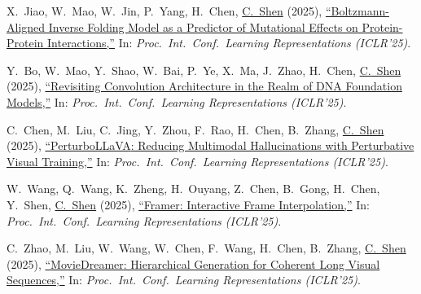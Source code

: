 \documentclass[9pt, a4paper]{article}
\newcommand{\years}[1]{\marginnote{\scriptsize #1}}
\def\highlight{\uline}
\begin{document}
\medskip

\years{2025} X.~Jiao, W.~Mao, W.~Jin, P.~Yang, H.~Chen, \highlight{C.~Shen} (2025),
\href{http://www.google.com/search?lr=&ie=UTF-8&oe=UTF-8&q=Boltzmann-Aligned+Inverse+Folding+Model+as+a+Predictor+of+Mutational+Effects+on+Protein-Protein+Interactions+Xiaoran+Jiao%2C+Weian+Mao%2C+Wengong+Jin%2C+Peiyuan+Yang%2C+Hao+Chen%2C+Chunhua+Shen}{``Boltzmann-Aligned Inverse Folding Model as a Predictor of Mutational Effects on Protein-Protein Interactions,{}''}
In: \emph{Proc.\ Int.\ Conf.\  Learning Representations (ICLR'25)}.

\medskip

\years{2025} Y.~Bo, W.~Mao, Y.~Shao, W.~Bai, P.~Ye, X.~Ma, J.~Zhao, H.~Chen, \highlight{C.~Shen} (2025),
\href{http://www.google.com/search?lr=&ie=UTF-8&oe=UTF-8&q=Revisiting+Convolution+Architecture+in+the+Realm+of+DNA+Foundation+Models+Yu+Bo%2C+Weian+Mao%2C+Yanjun+Shao%2C+Weiqiang+Bai%2C+Peng+Ye%2C+Xinzhu+Ma%2C+Junbo+Zhao%2C+Hao+Chen%2C+Chunhua+Shen}{``Revisiting Convolution Architecture in the Realm of {DNA} Foundation Models,{}''}
In: \emph{Proc.\ Int.\ Conf.\  Learning Representations (ICLR'25)}.

\medskip

\years{2025} C.~Chen, M.~Liu, C.~Jing, Y.~Zhou, F.~Rao, H.~Chen, B.~Zhang, \highlight{C.~Shen} (2025),
\href{http://www.google.com/search?lr=&ie=UTF-8&oe=UTF-8&q=PerturboLLaVA%3A+Reducing+Multimodal+Hallucinations+with+Perturbative+Visual+Training+Cong+Chen%2C+Mingyu+Liu%2C+Chenchen+Jing%2C+Yizhou+Zhou%2C+Fengyun+Rao%2C+Hao+Chen%2C+Bo+Zhang%2C+Chunhua+Shen}{``{PerturboLLaVA}: Reducing Multimodal Hallucinations with Perturbative Visual Training,{}''}
In: \emph{Proc.\ Int.\ Conf.\  Learning Representations (ICLR'25)}.

\medskip

\years{2025} W.~Wang, Q.~Wang, K.~Zheng, H.~Ouyang, Z.~Chen, B.~Gong, H.~Chen, Y.~Shen, \highlight{C.~Shen} (2025),
\href{http://www.google.com/search?lr=&ie=UTF-8&oe=UTF-8&q=Framer%3A+Interactive+Frame+Interpolation+Wen+Wang%2C+Qiuyu+Wang%2C+Kecheng+Zheng%2C+Hao+Ouyang%2C+Zhekai+Chen%2C+Biao+Gong%2C+Hao+Chen%2C+Yujun+Shen%2C+Chunhua+Shen}{``Framer: Interactive Frame Interpolation,{}''}
In: \emph{Proc.\ Int.\ Conf.\  Learning Representations (ICLR'25)}.

\medskip

\years{2025} C.~Zhao, M.~Liu, W.~Wang, W.~Chen, F.~Wang, H.~Chen, B.~Zhang, \highlight{C.~Shen} (2025),
\href{http://www.google.com/search?lr=&ie=UTF-8&oe=UTF-8&q=MovieDreamer%3A+Hierarchical+Generation+for+Coherent+Long+Visual+Sequences+Canyu+Zhao%2C+Mingyu+Liu%2C+Wen+Wang%2C+Weihua+Chen%2C+Fan+Wang%2C+Hao+Chen%2C+Bo+Zhang%2C+Chunhua+Shen}{``{MovieDreamer}: Hierarchical Generation for Coherent Long Visual Sequences,{}''}
In: \emph{Proc.\ Int.\ Conf.\  Learning Representations (ICLR'25)}.
\end{document}
